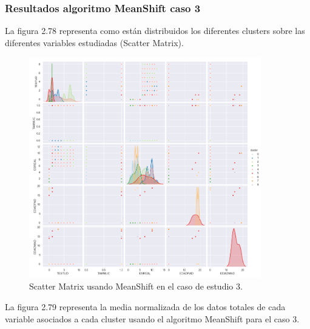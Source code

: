 
	\subsubsection{Resultados algoritmo MeanShift caso 3}


	La figura 2.78 representa como están distribuidos los diferentes clusters sobre las diferentes variables estudiadas
	(Scatter Matrix).\\

	\begin{figure}[htb]
		\centering
		\includegraphics[width=0.9\textwidth]{./imagenes/caso3/scatterMatrix_caso3_MeanShift}
		\caption{Scatter Matrix usando MeanShift en el caso de estudio 3.} \label{fig:1}
	\end{figure}

	La figura 2.79 representa la media normalizada de los datos totales de cada variable asociados
	a cada cluster usando el algoritmo MeanShift para el caso 3. \\

